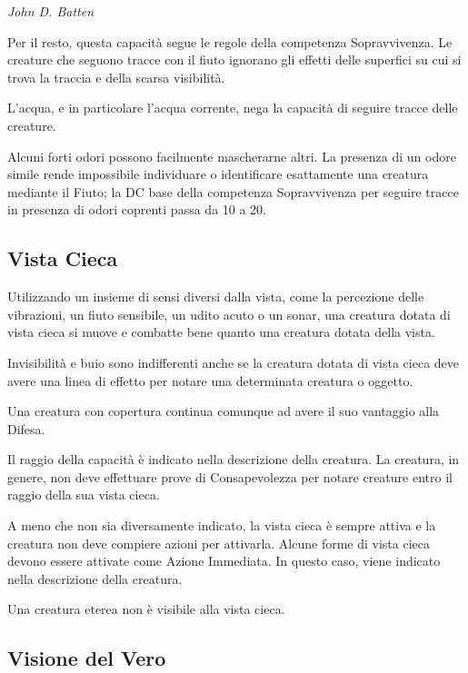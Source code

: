\begin{multicols}{2}
\begin{center}
\emph{John D. Batten}
\end{center}

Per il resto, questa capacità segue le regole della competenza Sopravvivenza. Le creature che seguono tracce con il fiuto ignorano gli effetti delle superfici su cui si trova la traccia e della scarsa visibilità.

L'acqua, e in particolare l'acqua corrente, nega la capacità di seguire tracce delle creature.

Alcuni forti odori possono facilmente mascherarne altri. La presenza di un odore simile rende impossibile individuare o identificare esattamente una creatura mediante il Fiuto; la DC base della competenza Sopravvivenza per seguire tracce in presenza di odori coprenti passa da 10 a 20.

\subsection{Vista Cieca}\label{vistacieca}

Utilizzando un insieme di sensi diversi dalla vista, come la percezione delle vibrazioni, un fiuto sensibile, un udito acuto o un sonar, una creatura dotata di vista cieca si muove e combatte bene quanto una creatura dotata della vista.

Invisibilità e buio sono indifferenti anche se la creatura dotata di vista cieca deve avere una linea di effetto per notare una determinata creatura o oggetto.

Una creatura con copertura continua comunque ad avere il suo vantaggio alla Difesa.

Il raggio della capacità è indicato nella descrizione della creatura. La creatura, in genere, non deve effettuare prove di Consapevolezza per notare creature entro il raggio della sua vista cieca.

A meno che non sia diversamente indicato, la vista cieca è sempre attiva e la creatura non deve compiere azioni per attivarla. Alcune forme di vista cieca devono essere attivate come Azione Immediata. In questo caso, viene indicato nella descrizione della creatura.

Una creatura eterea non è visibile alla vista cieca.

\subsection{Visione del Vero}\label{cap Visione del Vero}\hypertarget{cap Visione del Vero}{}


\end{multicols}
